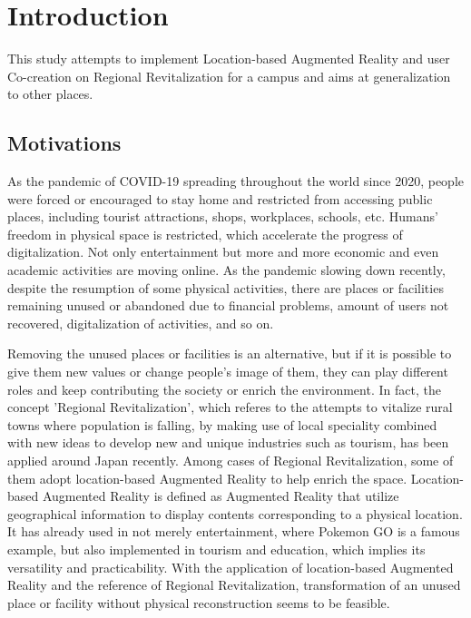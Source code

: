 \chapter{Introduction}

This study attempts to implement Location-based Augmented Reality and user Co-creation on Regional Revitalization for a campus and aims at generalization to other places.

\section{Motivations}

As the pandemic of COVID-19 spreading throughout the world since 2020,
people were forced or encouraged to stay home and restricted from accessing public places,
including tourist attractions, shops, workplaces, schools, etc.
Humans' freedom in physical space is restricted, which accelerate the progress of digitalization.
Not only entertainment but more and more economic and even academic activities are moving online.
As the pandemic slowing down recently, despite the resumption of some physical activities,
there are places or facilities remaining unused or abandoned due to financial problems,
amount of users not recovered, digitalization of activities, and so on.

Removing the unused places or facilities is an alternative, but if it is possible to give them new values or change people's image of them,
they can play different roles and keep contributing the society or enrich the environment.
In fact, the concept 'Regional Revitalization', which referes to the attempts to vitalize rural towns where population is falling,
by making use of local speciality combined with new ideas to develop new and unique industries such as tourism, has been applied around Japan recently.
Among cases of Regional Revitalization, some of them adopt location-based Augmented Reality to help enrich the space.
Location-based Augmented Reality is defined as Augmented Reality that utilize geographical information to display contents corresponding to a physical location.
It has already used in not merely entertainment, where Pokemon GO is a famous example,
but also implemented in tourism and education, which implies its versatility and practicability.
With the application of location-based Augmented Reality and the reference of Regional Revitalization,
transformation of an unused place or facility without physical reconstruction seems to be feasible.

